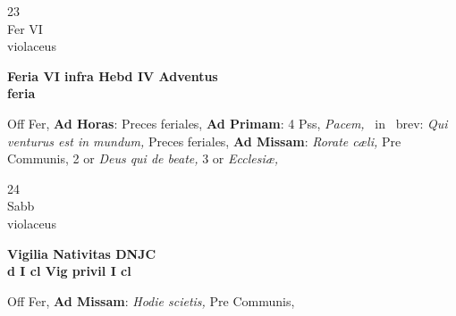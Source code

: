 \documentclass[10pt, openany]{book}
\begin{document}
        \begin{center}
            \begin{minipage}{3.5in}
                \vspace{2em}
                \begin{minipage}{0.5in}
                    {\Huge 23} \\
                    {\normalsize Fer VI} \\
                    {\normalsize violaceus}
                \end{minipage}
                \begin{minipage}{3.0in}
                    \textbf{ \large Feria VI infra Hebd IV Adventus \\
                    \textnormal{\normalsize feria}} \\ 
                \end{minipage}
                \begin{justify}Off Fer, \textbf{Ad Horas}: Preces feriales, \textbf{Ad Primam}: 4 Pss, \textit{Pacem,} \Vbar\ in \Rbar\ brev: \textit{Qui venturus est in mundum,} Preces feriales, \textbf{Ad Missam}: \textit{Rorate cæli,} Pre Communis, 2 or \textit{Deus qui de beate,} 3 or \textit{Ecclesiæ,}   
                \end{justify}
            \end{minipage}
        \end{center}
    
        \begin{center}
            \begin{minipage}{3.5in}
                \vspace{2em}
                \begin{minipage}{0.5in}
                    {\Huge 24} \\
                    {\normalsize Sabb} \\
                    {\normalsize violaceus}
                \end{minipage}
                \begin{minipage}{3.0in}
                    \textbf{ \large Vigilia Nativitas DNJC \\
                    \textnormal{\normalsize d I cl Vig privil I cl}} \\ 
                \end{minipage}
                \begin{justify}Off Fer, \textbf{Ad Missam}: \textit{Hodie scietis,} Pre Communis,   
                \end{justify}
            \end{minipage}
        \end{center}
    
\end{document}
